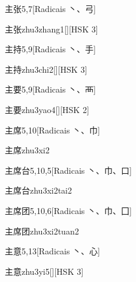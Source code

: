 \begin{entry}{主张}{5,7}[Radicais ⼂、⼸]
  \begin{phonetics}{主张}{zhu3zhang1}[][HSK 3]
  \end{phonetics}
\end{entry}

\begin{entry}{主持}{5,9}[Radicais ⼂、⼿]
  \begin{phonetics}{主持}{zhu3chi2}[][HSK 3]
  \end{phonetics}
\end{entry}

\begin{entry}{主要}{5,9}[Radicais ⼂、⾑]
  \begin{phonetics}{主要}{zhu3yao4}[][HSK 2]
  \end{phonetics}
\end{entry}

\begin{entry}{主席}{5,10}[Radicais ⼂、⼱]
  \begin{phonetics}{主席}{zhu3xi2}
  \end{phonetics}
\end{entry}

\begin{entry}{主席台}{5,10,5}[Radicais ⼂、⼱、⼝]
  \begin{phonetics}{主席台}{zhu3xi2tai2}
  \end{phonetics}
\end{entry}

\begin{entry}{主席团}{5,10,6}[Radicais ⼂、⼱、⼞]
  \begin{phonetics}{主席团}{zhu3xi2tuan2}
  \end{phonetics}
\end{entry}

\begin{entry}{主意}{5,13}[Radicais ⼂、⼼]
  \begin{phonetics}{主意}{zhu3yi5}[][HSK 3]
  \end{phonetics}
\end{entry}

